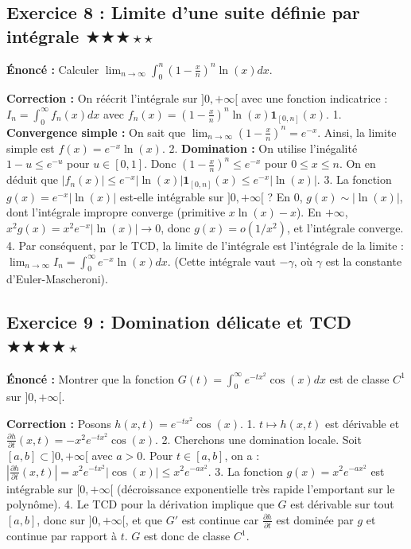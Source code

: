 \documentclass[11pt,a4paper]{article}
\begin{document}
\subsection*{{Exercice 8 : Limite d'une suite définie par intégrale \quad $\bigstar\bigstar\bigstar\star\star$}}

\textbf{Énoncé :}
Calculer $\lim_{n \to \infty} \int_0^n \left(1 - \frac{x}{n}\right)^n \ln(x) dx$.

\textbf{Correction :}
On réécrit l'intégrale sur $]0, +\infty[$ avec une fonction indicatrice :
$I_n = \int_0^\infty f_n(x) dx$ avec $f_n(x) = \left(1 - \frac{x}{n}\right)^n \ln(x) \mathbf{1}_{[0, n]}(x)$.
1. \textbf{Convergence simple :} On sait que $\lim_{n \to \infty} \left(1 - \frac{x}{n}\right)^n = e^{-x}$. Ainsi, la limite simple est $f(x) = e^{-x} \ln(x)$.
2. \textbf{Domination :} On utilise l'inégalité $1 - u \le e^{-u}$ pour $u \in [0, 1]$.
   Donc $\left(1 - \frac{x}{n}\right)^n \le e^{-x}$ pour $0 \le x \le n$.
   On en déduit que $|f_n(x)| \le e^{-x} |\ln(x)| \mathbf{1}_{[0, n]}(x) \le e^{-x} |\ln(x)|$.
3. La fonction $g(x) = e^{-x} |\ln(x)|$ est-elle intégrable sur $]0, +\infty[$ ?
   En 0, $g(x) \sim |\ln(x)|$, dont l'intégrale impropre converge (primitive $x \ln(x) - x$).
   En $+\infty$, $x^2 g(x) = x^2 e^{-x} |\ln(x)| \to 0$, donc $g(x) = o(1/x^2)$, et l'intégrale converge.
4. Par conséquent, par le TCD, la limite de l'intégrale est l'intégrale de la limite :
   $\lim_{n \to \infty} I_n = \int_0^\infty e^{-x} \ln(x) dx$. (Cette intégrale vaut $-\gamma$, où $\gamma$ est la constante d'Euler-Mascheroni).


\subsection*{{Exercice 9 : Domination délicate et TCD \quad $\bigstar\bigstar\bigstar\bigstar\star$}}

\textbf{Énoncé :}
Montrer que la fonction $G(t) = \int_0^\infty e^{-tx^2} \cos(x) dx$ est de classe $C^1$ sur $]0, +\infty[$.

\textbf{Correction :}
Posons $h(x, t) = e^{-tx^2} \cos(x)$.
1. $t \mapsto h(x, t)$ est dérivable et $\frac{\partial h}{\partial t}(x, t) = -x^2 e^{-tx^2} \cos(x)$.
2. Cherchons une domination locale. Soit $[a, b] \subset ]0, +\infty[$ avec $a > 0$.
   Pour $t \in [a, b]$, on a :
   $\left| \frac{\partial h}{\partial t}(x, t) \right| = x^2 e^{-tx^2} |\cos(x)| \le x^2 e^{-ax^2}$.
3. La fonction $g(x) = x^2 e^{-ax^2}$ est intégrable sur $[0, +\infty[$ (décroissance exponentielle très rapide l'emportant sur le polynôme).
4. Le TCD pour la dérivation implique que $G$ est dérivable sur tout $[a, b]$, donc sur $]0, +\infty[$, et que $G'$ est continue car $\frac{\partial h}{\partial t}$ est dominée par $g$ et continue par rapport à $t$. $G$ est donc de classe $C^1$.
\end{document}
